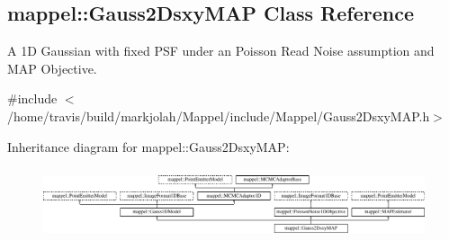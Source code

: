 \hypertarget{classmappel_1_1Gauss2DsxyMAP}{}\subsection{mappel\+:\+:Gauss2\+Dsxy\+M\+AP Class Reference}
\label{classmappel_1_1Gauss2DsxyMAP}


A 1D Gaussian with fixed P\+SF under an Poisson Read Noise assumption and M\+AP Objective.  




{\ttfamily \#include $<$/home/travis/build/markjolah/\+Mappel/include/\+Mappel/\+Gauss2\+Dsxy\+M\+A\+P.\+h$>$}

Inheritance diagram for mappel\+:\+:Gauss2\+Dsxy\+M\+AP\+:\begin{figure}[H]
\begin{center}
\leavevmode
\includegraphics[height=2.113208cm]{classmappel_1_1Gauss2DsxyMAP}
\end{center}
\end{figure}
